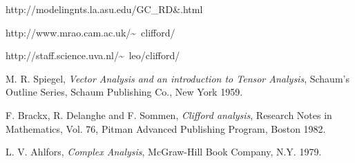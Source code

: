 \documentclass[12]{article}
\begin{document}
\begin{thebibliography}{}
http://modelingnts.la.asu.edu/GC\_RD\&.html 

http://www.mrao.cam.ac.uk/\~~clifford/ 

http://staff.science.uva.nl/\~~leo/clifford/ 

 M. R. Spiegel, {\it Vector Analysis and an introduction to Tensor Analysis}, Schaum's Outline Series,
Schaum Publishing Co., New York 1959.

 F. Brackx, R. Delanghe and F. Sommen, {\it Clifford analysis}, Research Notes in Mathematics, 
Vol. 76, Pitman Advanced Publishing Program, Boston 1982. 


 L. V. Ahlfors, {\it Complex Analysis}, McGraw-Hill Book Company, N.Y. 1979.

\end{thebibliography}
\end{document}
